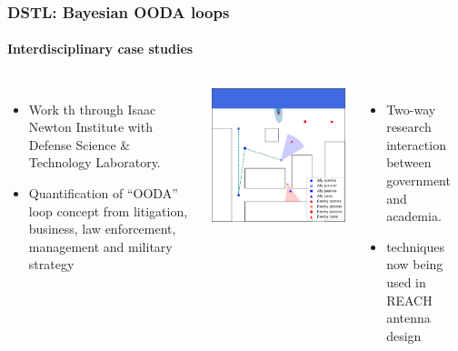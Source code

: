\documentclass[aspectratio=169, handout]{beamer}
\begin{document}
\begin{frame}
    \frametitle{DSTL: Bayesian OODA loops}
    \framesubtitle{Interdisciplinary case studies}
    \begin{columns}
        \begin{itemize}
            \item Work th through Isaac Newton Institute with Defense Science \& Technology Laboratory.
            \item Quantification of ``OODA'' loop concept from litigation, business, law enforcement, management and military strategy
        \end{itemize}


        \begin{columns}
            \includegraphics[width=\textwidth]{figures/midas.png}%
            \begin{itemize}
                \item Two-way research interaction between government and academia.
                \item techniques now being used in REACH antenna design~
            \end{itemize}
        \end{columns}



\end{columns}
\end{frame}
\end{document}
